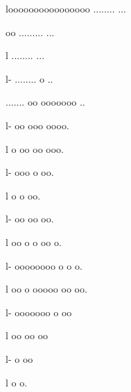 {     loooooooooooooooo            ........                             
...                                   

     oo                   .........                                    
...                                

     l             ........                                            
...                              

     l-    ........                                                    o
..                             

     .......                                                          oo
ooooooo ..                           

     l-                                                              oo
ooo     oooo.                          

     l                                               o              oo 
oo          ooo.                        

     l-                                                           ooo  
o              oo.                       

     l                                                             o   
o                oo.                      

     l-                                                           oo   
oo                 oo.                     

     l                                              oo       o    o    
oo                    o.                    

     l-                                        oooooooo          o     
o                      o.                   

     l                                        oo      o      ooooo     
oo                      oo.                  

     l-                                                ooooooo         
o                        oo                  

     l                                                oo               
oo                         oo                 

     l-                                                                
o                           oo                

     l                                                                 
o                            o.               

}
